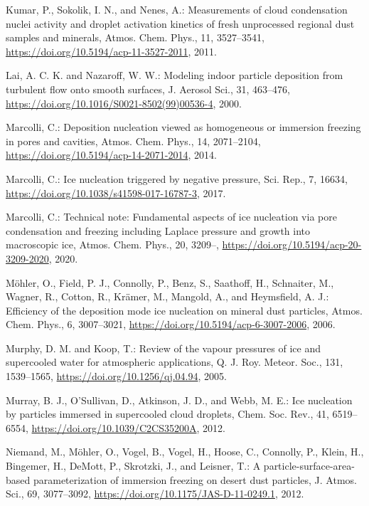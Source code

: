 \begin{thebibliography}{}
Kumar, P., Sokolik, I. N., and Nenes, A.: Measurements of cloud condensation nuclei activity and droplet activation kinetics of fresh unprocessed regional dust samples and minerals, Atmos. Chem. Phys., 11, 3527--3541, \url{https://doi.org/10.5194/acp-11-3527-2011}, 2011.

Lai, A. C. K. and Nazaroff, W. W.: Modeling indoor particle deposition from turbulent flow onto smooth surfaces, J. Aerosol Sci., 31, 463--476, \url{https://doi.org/10.1016/S0021-8502(99)00536-4}, 2000.

Marcolli, C.: Deposition nucleation viewed as homogeneous or immersion freezing in pores and cavities, Atmos. Chem. Phys., 14, 2071--2104, \url{https://doi.org/10.5194/acp-14-2071-2014}, 2014.

Marcolli, C.: Ice nucleation triggered by negative pressure, Sci. Rep., 7, 16634, \url{https://doi.org/10.1038/s41598-017-16787-3}, 2017.

Marcolli, C.: Technical note: Fundamental aspects of ice nucleation via pore condensation and freezing including Laplace pressure and growth into macroscopic ice, Atmos. Chem. Phys., 20, 3209--, \url{https://doi.org/10.5194/acp-20-3209-2020}, 2020.

M\"ohler, O., Field, P. J., Connolly, P., Benz, S., Saathoff, H., Schnaiter, M., Wagner, R., Cotton, R., Kr\"amer, M., Mangold, A., and Heymsfield, A. J.: Efficiency of the deposition mode ice nucleation on mineral dust particles, Atmos. Chem. Phys., 6, 3007--3021, \url{https://doi.org/10.5194/acp-6-3007-2006}, 2006.

Murphy, D. M. and Koop, T.: Review of the vapour pressures of ice and supercooled water for atmospheric applications, Q. J. Roy. Meteor. Soc., 131, 1539--1565, \url{https://doi.org/10.1256/qj.04.94}, 2005.

Murray, B. J., O'Sullivan, D., Atkinson, J. D., and Webb, M. E.: Ice nucleation by particles immersed in supercooled cloud droplets, Chem. Soc. Rev., 41, 6519--6554, \url{https://doi.org/10.1039/C2CS35200A}, 2012.

Niemand, M., M\"ohler, O., Vogel, B., Vogel, H., Hoose, C., Connolly, P., Klein, H., Bingemer, H., DeMott, P., Skrotzki, J., and Leisner, T.: A particle-surface-area-based parameterization of immersion freezing on desert dust particles, J. Atmos. Sci., 69, 3077--3092, \url{https://doi.org/10.1175/JAS-D-11-0249.1}, 2012.


\end{thebibliography}

